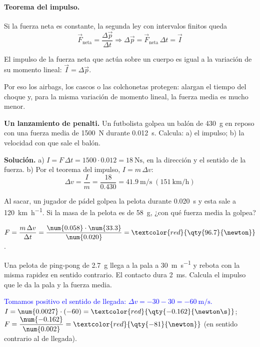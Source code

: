 \paragraph{Teorema del impulso.} Si la fuerza neta es constante, la segunda ley con intervalos finitos queda
\[ \vec{F}_{\text{neta}} = \frac{\Delta\vec{p}}{\Delta t} \Rightarrow \Delta\vec{p} = \vec{F}_{\text{neta}}\,\Delta t = \vec{I} \]

\begin{definition}
    El impulso de la fuerza neta que actúa sobre un cuerpo es igual a la variación de su momento lineal: \(\vec{I} = \Delta\vec{p}\).
\end{definition}

Por eso los airbags, los cascos o las colchonetas protegen: alargan el tiempo del choque y, para la misma variación de momento lineal,
la fuerza media es mucho menor.

\begin{example}
    \textbf{Un lanzamiento de penalti.} Un futbolista golpea un balón de \qty{430}{\g} en reposo con una fuerza media de
    \qty{1500}{\newton} durante \qty{0.012}{\s}. Calcula: a) el impulso; b) la velocidad con que sale el balón.

    \textbf{Solución.} a) \(I = F\,\Delta t = 1500 \cdot \num{0.012} = \qty{18}{\newton\s}\), en la dirección y el sentido de la fuerza.
    b) Por el teorema del impulso, \(I = m\,\Delta v\):
    \[ \Delta v = \frac{I}{m} = \frac{18}{\num{0.430}} = \qty{41.9}{\m\per\s} \;(\qty{151}{\km\per\hour}) \]
\end{example}

\begin{exercise}
    Al sacar, un jugador de pádel golpea la pelota durante \qty{0.020}{\s} y esta sale a \qty{120}{\km\per\hour}. Si la masa de la
    pelota es de \qty{58}{\g}, ¿con qué fuerza media la golpea?
    \begin{solu}
        \(F = \dfrac{m\,\Delta v}{\Delta t} = \dfrac{\num{0.058} \cdot \num{33.3}}{\num{0.020}} = \textcolor{red}{\qty{96.7}{\newton}}\).
    \end{solu}
\end{exercise}

\begin{exercise}
    Una pelota de ping-pong de \qty{2.7}{\g} llega a la pala a \qty{30}{\m\per\s} y rebota con la misma rapidez en sentido contrario.
    El contacto dura \qty{2}{\milli\s}. Calcula el impulso que le da la pala y la fuerza media.
    \begin{solu}
        \textcolor{blue}{Tomamos positivo el sentido de llegada: \(\Delta v = -30 - 30 = \qty{-60}{\m\per\s}\).}
        \(I = \num{0.0027} \cdot (-60) = \textcolor{red}{\qty{-0.162}{\newton\s}}\); \(F = \dfrac{\num{-0.162}}{\num{0.002}} =
        \textcolor{red}{\qty{-81}{\newton}}\) (en sentido contrario al de llegada).
    \end{solu}
\end{exercise}

